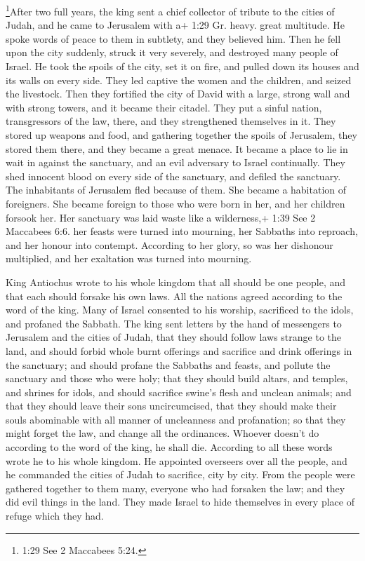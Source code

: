  \footnote{1:29 See 2 Maccabees 5:24.}After two full years,
the king sent a chief collector of tribute to the cities of Judah, and
he came to Jerusalem with a+ 1:29 Gr. heavy. great multitude.
 He spoke words of peace to them in subtlety, and they
believed him. Then he fell upon the city suddenly, struck it very
severely, and destroyed many people of Israel.  He took the
spoils of the city, set it on fire, and pulled down its houses and its
walls on every side.  They led captive the women and the
children, and seized the livestock.  Then they fortified
the city of David with a large, strong wall and with strong towers, and
it became their citadel.  They put a sinful nation,
transgressors of the law, there, and they strengthened themselves in it.
 They stored up weapons and food, and gathering together
the spoils of Jerusalem, they stored them there, and they became a great
menace.  It became a place to lie in wait in against the
sanctuary, and an evil adversary to Israel continually. 
They shed innocent blood on every side of the sanctuary, and defiled the
sanctuary.  The inhabitants of Jerusalem fled because of
them. She became a habitation of foreigners. She became foreign to those
who were born in her, and her children forsook her.  Her
sanctuary was laid waste like a wilderness,+ 1:39 See 2 Maccabees 6:6.
her feasts were turned into mourning, her Sabbaths into reproach, and
her honour into contempt.  According to her glory, so was
her dishonour multiplied, and her exaltation was turned into mourning.

 King Antiochus wrote to his whole kingdom that all should
be one people,  and that each should forsake his own laws.
All the nations agreed according to the word of the king. 
Many of Israel consented to his worship, sacrificed to the idols, and
profaned the Sabbath.  The king sent letters by the hand of
messengers to Jerusalem and the cities of Judah, that they should follow
laws strange to the land,  and should forbid whole burnt
offerings and sacrifice and drink offerings in the sanctuary; and should
profane the Sabbaths and feasts,  and pollute the sanctuary
and those who were holy;  that they should build altars,
and temples, and shrines for idols, and should sacrifice swine's flesh
and unclean animals;  and that they should leave their sons
uncircumcised, that they should make their souls abominable with all
manner of uncleanness and profanation;  so that they might
forget the law, and change all the ordinances.  Whoever
doesn't do according to the word of the king, he shall die.
 According to all these words wrote he to his whole
kingdom. He appointed overseers over all the people, and he commanded
the cities of Judah to sacrifice, city by city.  From the
people were gathered together to them many, everyone who had forsaken
the law; and they did evil things in the land.  They made
Israel to hide themselves in every place of refuge which they had.

